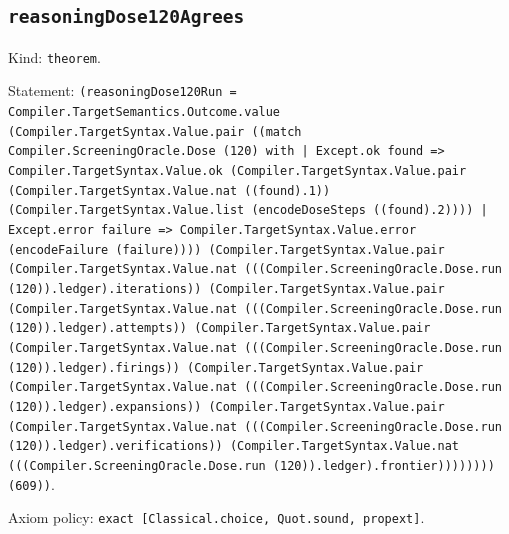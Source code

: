 \documentclass[11pt]{article}
\begin{document}
\subsection*{\texttt{reasoningDose120Agrees}}
\noindent Kind: \texttt{theorem}.\par
\noindent Statement: \texttt{(reasoningDose120Run = Compiler.TargetSemantics.Outcome.value (Compiler.TargetSyntax.Value.pair ((match Compiler.ScreeningOracle.Dose (120) with | Except.ok found => Compiler.TargetSyntax.Value.ok (Compiler.TargetSyntax.Value.pair (Compiler.TargetSyntax.Value.nat ((found).1)) (Compiler.TargetSyntax.Value.list (encodeDoseSteps ((found).2)))) | Except.error failure => Compiler.TargetSyntax.Value.error (encodeFailure (failure)))) (Compiler.TargetSyntax.Value.pair (Compiler.TargetSyntax.Value.nat (((Compiler.ScreeningOracle.Dose.run (120)).ledger).iterations)) (Compiler.TargetSyntax.Value.pair (Compiler.TargetSyntax.Value.nat (((Compiler.ScreeningOracle.Dose.run (120)).ledger).attempts)) (Compiler.TargetSyntax.Value.pair (Compiler.TargetSyntax.Value.nat (((Compiler.ScreeningOracle.Dose.run (120)).ledger).firings)) (Compiler.TargetSyntax.Value.pair (Compiler.TargetSyntax.Value.nat (((Compiler.ScreeningOracle.Dose.run (120)).ledger).expansions)) (Compiler.TargetSyntax.Value.pair (Compiler.TargetSyntax.Value.nat (((Compiler.ScreeningOracle.Dose.run (120)).ledger).verifications)) (Compiler.TargetSyntax.Value.nat (((Compiler.ScreeningOracle.Dose.run (120)).ledger).frontier)))))))) (609))}.\par
\noindent Axiom policy: \texttt{exact [Classical.choice, Quot.sound, propext]}.\par
\end{document}
